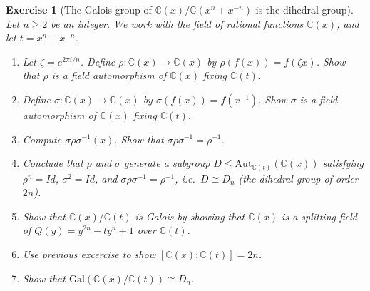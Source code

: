 \documentclass{article}
\newtheorem{exer}{Exercise}
\newcommand{\C}{\mathbb{C}}
\begin{document}
\begin{exer}[The Galois group of $\C(x)/\C(x^n+x^{-n})$ is the dihedral group]\label{exer:dihedral-galois}
Let $n\ge 2$ be an integer. We work with the field of rational functions $\C(x)$, and let $t=x^n+x^{-n}$.

\medskip

\begin{enumerate}
\item[(a)] Let $\zeta=e^{2\pi i/n}$. Define $\rho\colon\C(x)\to\C(x)$ by $\rho(f(x))=f(\zeta x)$. Show that $\rho$ is a field automorphism of $\C(x)$ fixing $\C(t)$.
\item[(b)] Define $\sigma\colon\C(x)\to\C(x)$ by $\sigma(f(x))=f(x^{-1})$. Show $\sigma$ is a field automorphism of $\C(x)$ fixing $\C(t)$.
\item[(c)] Compute $\sigma\rho\sigma^{-1}(x)$. Show that $\sigma\rho\sigma^{-1}=\rho^{-1}$.
\item[(d)] Conclude that $\rho$ and $\sigma$ generate a subgroup $D\leq\mathrm{Aut}_{\C(t)}(\C(x))$ satisfying $\rho^n=Id$, $\sigma^2=Id$, and $\sigma\rho\sigma^{-1}=\rho^{-1}$, i.e.\ $D\cong D_n$ (the dihedral group of order $2n$).


\item[(e)] Show that $\C(x)/\C(t)$ is Galois by showing that $\C(x)$ is a splitting field of $Q(y)=y^{2n}-ty^n+1$ over $\C(t)$.

\item[(f)] Use previous excercise to show $[\C(x):\C(t)]= 2n$.

\item[(g)] Show that $\mathrm{Gal}(\C(x)/\C(t))\cong D_n$.
\end{enumerate}

\end{exer}
\end{document}
